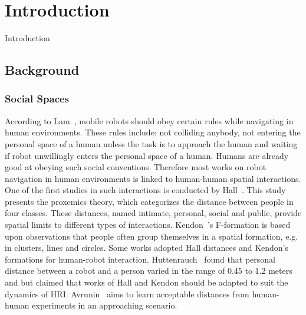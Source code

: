 \chapter{Introduction}
\label{chapter:introduction}
Introduction

\section{Background}

\subsection{Social Spaces}

According to Lam~\cite{lam2011human}, mobile robots should obey certain rules while navigating in human environments. These rules include: not colliding anybody, not entering the personal space of a human unless the task is to approach the human and waiting if robot unwillingly enters the personal space of a human. Humans are already good at obeying such social conventions. Therefore most works on robot navigation in human environments is linked to human-human spatial interactions. One of the first studies in such interactions is conducted by Hall~\cite{hall1969hidden}. This study presents the proxemics theory, which categorizes the distance between people in four classes. These distances, named intimate, personal, social and public, provide spatial limits to different types of interactions. Kendon~\cite{kendon1990conducting}'s F-formation is based upon observations that people often group themselves in a spatial formation, e.g. in clusters, lines and circles. Some works adopted Hall distances and Kendon's formations for human-robot interaction. Huttenrauch~\cite{huttenrauch2006investigating} found that personal distance between a robot and a person varied in the range of 0.45 to 1.2 meters and but claimed that works of Hall and Kendon should be adapted to suit the dynamics of HRI. Avrunin~\cite{avrunin2013using} aims to learn acceptable distances from human-human experiments in an approaching scenario. 